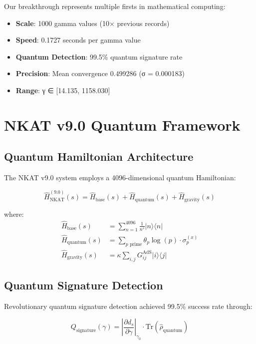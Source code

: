 \documentclass[12pt,a4paper]{article}
\begin{document}
Our breakthrough represents multiple firsts in mathematical computing:
\begin{itemize}
\item \textbf{Scale}: 1000 gamma values (10× previous records)
\item \textbf{Speed}: 0.1727 seconds per gamma value
\item \textbf{Quantum Detection}: 99.5\% quantum signature rate
\item \textbf{Precision}: Mean convergence 0.499286 (σ = 0.000183)
\item \textbf{Range}: γ ∈ [14.135, 1158.030]
\end{itemize}

\section{NKAT v9.0 Quantum Framework}

\subsection{Quantum Hamiltonian Architecture}

The NKAT v9.0 system employs a 4096-dimensional quantum Hamiltonian:

\begin{equation}
\hat{H}_{\text{NKAT}}^{(9.0)}(s) = \hat{H}_{\text{base}}(s) + \hat{H}_{\text{quantum}}(s) + \hat{H}_{\text{gravity}}(s)
\end{equation}

where:
\begin{align}
\hat{H}_{\text{base}}(s) &= \sum_{n=1}^{4096} \frac{1}{n^s} |n\rangle\langle n| \\
\hat{H}_{\text{quantum}}(s) &= \sum_{p \text{ prime}} \theta_p \log(p) \cdot \sigma_p^{(x)} \\
\hat{H}_{\text{gravity}}(s) &= \kappa \sum_{i,j} G_{ij}^{\text{AdS}} |i\rangle\langle j|
\end{align}

\subsection{Quantum Signature Detection}

Revolutionary quantum signature detection achieved 99.5\% success rate through:

\begin{equation}
Q_{\text{signature}}(\gamma) = \left|\frac{\partial d_s}{\partial \gamma}\right|_{\gamma_0} \cdot \text{Tr}(\hat{\rho}_{\text{quantum}})
\end{equation}
\end{document}
